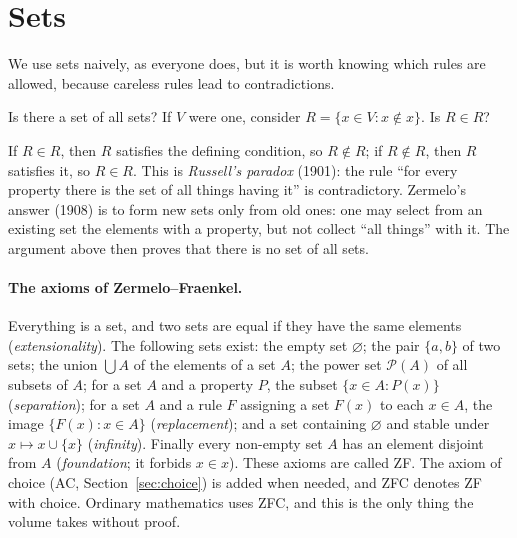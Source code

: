 \section{Sets}

We use sets naively, as everyone does, but it is worth knowing which rules are allowed, because careless rules lead
to contradictions.

\begin{think}
Is there a set of all sets? If $V$ were one, consider $R=\{x\in V:x\notin x\}$. Is $R\in R$?
\end{think}

If $R\in R$, then $R$ satisfies the defining condition, so $R\notin R$; if $R\notin R$, then $R$ satisfies it, so $R\in R$.
This is \emph{Russell's paradox} (1901): the rule ``for every property there is the set of all things having it'' is
contradictory. Zermelo's answer (1908) is to form new sets only from old ones: one may select from an existing set
the elements with a property, but not collect ``all things'' with it. The argument above then proves that there is
no set of all sets.

\paragraph{The axioms of Zermelo--Fraenkel.} Everything is a set, and two sets are equal if they have the same
elements (\emph{extensionality}). The following sets exist: the empty set $\varnothing$; the pair $\{a,b\}$ of two sets;
the union $\bigcup A$ of the elements of a set $A$; the power set $\mathcal P(A)$ of all subsets of $A$; for a set $A$
and a property $P$, the subset $\{x\in A:P(x)\}$ (\emph{separation}); for a set $A$ and a rule $F$ assigning a set $F(x)$
to each $x\in A$, the image $\{F(x):x\in A\}$ (\emph{replacement}); and a set containing $\varnothing$ and stable under
$x\mapsto x\cup\{x\}$ (\emph{infinity}). Finally every non-empty set $A$ has an element disjoint from $A$
(\emph{foundation}; it forbids $x\in x$). These axioms are called ZF. The axiom of choice (AC, Section~\ref{sec:choice})
is added when needed, and ZFC denotes ZF with choice. Ordinary mathematics uses ZFC, and this is the only thing the
volume takes without proof.

